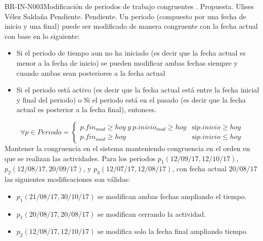 \begin{BusinessRule}{BR-IN-N003}{Modificación de periodos de trabajo congruentes}
	{\bcCondition}    %
	{\btEnabler}     %
	{\blControlling}    %
	.
	\BRItem[Estado] Propuesta.
	 Ulises Vélez Saldaña
	 Pendiente.
	 Pendiente.
	\BRItem[Descripción] Un periodo (compuesto por una fecha de inicio y una final) puede ser modificado de manera congruente con la fecha actual con base en lo siguiente:
	\begin{itemize}
		\item Si el periodo de tiempo aun no ha iniciado (es decir que la fecha actual es menor a la fecha de inicio) se pueden modificar ambas fechas siempre y cuando ambas sean posteriores a la fecha actual
		\item Si el periodo está activo (es decir que la fecha actual está entre la fecha inicial y final del periodo) o Si el periodo está en el pasado (es decir que la fecha actual es posterior a la fecha final), entonces.
	\end{itemize}
	\BRItem[Sentencia] 
    	\begin{equation*}
    		\forall p \in Periodo = \left\{
    		\begin{array}{rl}
    			 p.fin_{mod} \geq hoy~{}y~{}p.inicio_{mod} \geq hoy  & \text{si} p.inicio \geq hoy\\ 
    			 p.fin_{mod} \geq hoy &\text{si} p.inicio \leq hoy
        	\end{array} \right.
    	\end{equation*}
	\BRItem[Motivación] Mantener la congruencia en el sistema manteniendo congruencia en el orden en que se realizan las actividades.
	 Para los periodos $p_{1}(12/09/17, 12/10/17)$, $p_{2}(12/08/17, 20/09/17)$, y $p_{3}(12/07/17, 12/08/17)$, con fecha actual $20/08/17$ las siguientes modificaciones son válidas:
		\begin{itemize}
			\item $p_{1}(21/08/17, 30/10/17)$ se modifican ambas fechas ampliando el tiempo.
			\item $p_{1}(20/08/17, 20/08/17)$ se modifican cerrando la actividad.
			\item $p_{2}(12/08/17, 12/10/17)$ se modifica solo la fecha final ampliando tiempo

\end{itemize}
\end{BusinessRule}
